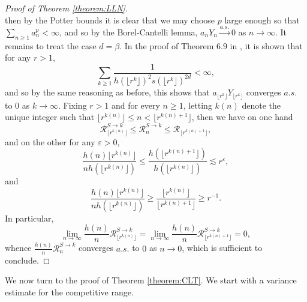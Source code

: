\documentclass[10pt,a4paper]{amsart}
\newcommand{\R}{\mathcal R}
\newcommand{\1}{\mathds{1}}
\numberwithin{equation}{section}
\begin{document}
\begin{proof}[Proof of Theorem \ref{theorem:LLN}]
\begin{equation*}
\end{equation*}
then by the Potter bounds it is clear that we may choose $p$ large enough so that $\sum_{n\ge1}a_n^p<\infty$, and so by the Borel-Cantelli lemma, $a_nY_n\overset{a.s.}\longrightarrow0$ as $n\rightarrow\infty$. It remains to treat the case $d=\beta$. In the proof of Theorem $6.9$ in \cite{LeGallRosenRangeOfStableRandomWalks1991}, it is shown that for any $r>1$, 
\begin{equation*}
    \sum_{k\ge1}\frac{1}{h(\lfloor r^k\rfloor)^2s(\lfloor r^k\rfloor)^{2d}}<\infty,
\end{equation*}
and so by the same reasoning as before, this shows that $a_{\lfloor r^k\rfloor}Y_{\lfloor r^k\rfloor}$ converges $a.s.$ to $0$ as $k\rightarrow\infty$. Fixing $r>1$ and for every $n\ge1$, letting $k(n)$ denote the unique integer such that $\lfloor r^{k(n)}\rfloor\le n<\lfloor r^{k(n)+1}\rfloor$, then we have on one hand 
\begin{equation*}
    \R_{\lfloor r^{k(n)}\rfloor}^{S\rightarrow k}\le\R_n^{S\rightarrow k}\le\R_{\lfloor r^{k(n)+1}\rfloor},
\end{equation*}
and on the other for any $\varepsilon>0$,
\begin{equation*}
    \frac{h(n)\lfloor r^{k(n)}\rfloor}{nh(\lfloor r^{k(n)}\rfloor)}\le \frac{h(\lfloor r^{k(n)+1}\rfloor)}{h(\lfloor r^{k(n)}\rfloor)}\lesssim r^{\varepsilon},
\end{equation*}
and
\begin{equation*}
    \frac{h(n)\lfloor r^{k(n)}\rfloor}{nh(\lfloor r^{k(n)}\rfloor)}\ge\frac{\lfloor r^{k(n)}\rfloor}{\lfloor r^{k(n)+1}\rfloor}\ge r^{-1}.
\end{equation*}
In particular, 
\begin{equation*}
    \lim_{n\rightarrow\infty}\frac{h(n)}{n}\R_{\lfloor r^{k(n)}\rfloor}^{S\rightarrow k}=\lim_{n\rightarrow\infty}\frac{h(n)}{n}\R_{\lfloor r^{k(n)+1}\rfloor}^{S\rightarrow k}=0,
\end{equation*}
whence $\frac{h(n)}{n}\R_n^{S\rightarrow k}$ converges $a.s.$ to $0$ as $n\rightarrow0$, which is sufficient to conclude.
\end{proof}

We now turn to the proof of Theorem \ref{theorem:CLT}. We start with a variance estimate for the competitive range.
\end{document}
